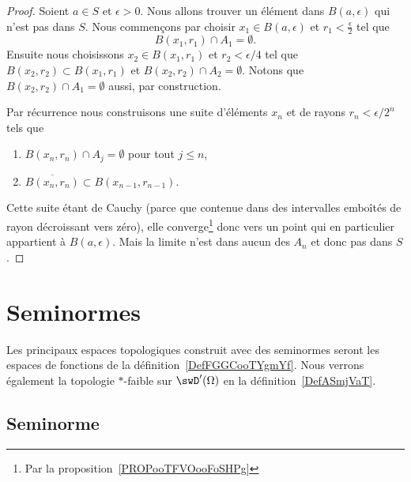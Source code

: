 \begin{proof}
	Soient \( a\in S\) et \( \epsilon>0\). Nous allons trouver un élément dans \( B(a,\epsilon)\) qui n'est pas dans \( S\). Nous commençons par choisir \( x_1\in B(a,\epsilon)\) et \( r_1<\frac{ \epsilon }{2}\) tel que
	\begin{equation}
		B(x_1,r_1)\cap A_1=\emptyset.
	\end{equation}
	Ensuite nous choisissons \( x_2\in B(x_1,r_1)\) et \( r_2<\epsilon/4\) tel que \( B(x_2,r_2)\subset B(x_1,r_1)\) et \( B(x_2,r_2)\cap A_2=\emptyset\). Notons que \( B(x_2,r_2)\cap A_1=\emptyset\) aussi, par construction.

	Par récurrence nous construisons une suite d'éléments \( x_n\) et de rayons \( r_n<\epsilon/2^n\) tels que
	\begin{enumerate}
		\item
		      \( B(x_n,r_n)\cap A_j=\emptyset\) pour tout \( j\leq n\),
		\item
		      \( \overline{ B(x_n,r_n) }\subset B(x_{n-1},r_{n-1})\).
	\end{enumerate}
	Cette suite étant de Cauchy (parce que contenue dans des intervalles emboîtés de rayon décroissant vers zéro), elle converge\footnote{Par la proposition~\ref{PROPooTFVOooFoSHPg}} donc vers un point qui en particulier appartient à \( B(a,\epsilon)\). Mais la limite n'est dans aucun des \( A_n\) et donc pas dans \( S\).
\end{proof}

\section{Seminormes}

Les principaux espaces topologiques construit avec des seminormes seront les espaces de fonctions de la définition~\ref{DefFGGCooTYgmYf}. Nous verrons également la topologie \( *\)-faible sur \( \swD'(\Omega)\) en la définition~\ref{DefASmjVaT}.

\subsection{Seminorme}

